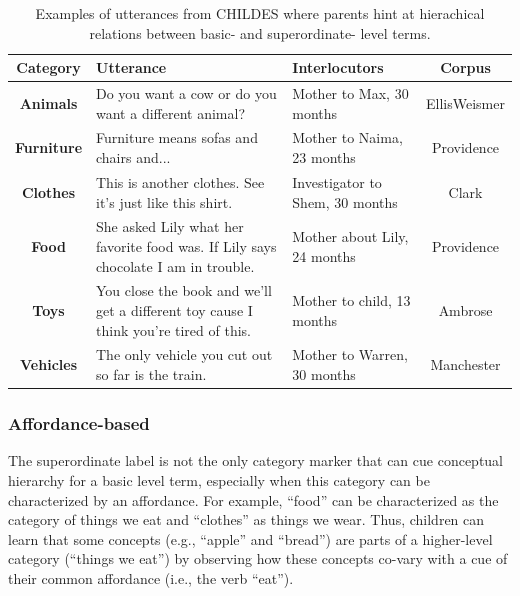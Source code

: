 \documentclass[english,,man,floatsintext]{apa6}
\begin{document}
\begin{table}[!htbp] \centering 
\begin{tabularx}{\linewidth}{cXXc}
\hline
\textbf{Category} & Utterance & Interlocutors & Corpus\\
\hline

\textbf{Animals} & Do you want a cow or do you want a different animal? & Mother to Max, 30 months & EllisWeismer\\

\textbf{Furniture} & Furniture means sofas and chairs and... & Mother to Naima, 23 months & Providence\\

\textbf{Clothes} & This is another clothes. See it's just like this shirt. & Investigator to Shem, 30 months & Clark\\

\textbf{Food} & She asked Lily what her favorite food was. If Lily says chocolate I am in trouble. & Mother about Lily, 24 months & Providence\\

\textbf{Toys} & You close the book and we'll get a different toy cause I think you're tired of this. & Mother to child, 13 months & Ambrose\\

\textbf{Vehicles} & The only vehicle you cut out so far is the train. & Mother to Warren, 30 months & Manchester\\

\hline
\end{tabularx}
\caption{\label{tab:pragmatic} Examples of utterances from CHILDES where parents hint at hierachical relations between basic- and superordinate- level terms.}
\end{table}

\hypertarget{affordance-based}{%
\subsubsection{Affordance-based}\label{affordance-based}}

The superordinate label is not the only category marker that can cue conceptual hierarchy for a basic level term, especially when this category can be characterized by an affordance. For example, \enquote{food} can be characterized as the category of things we eat and \enquote{clothes} as things we wear. Thus, children can learn that some concepts (e.g., \enquote{apple} and \enquote{bread}) are parts of a higher-level category (\enquote{things we eat}) by observing how these concepts co-vary with a cue of their common affordance (i.e., the verb \enquote{eat}).
\end{document}
